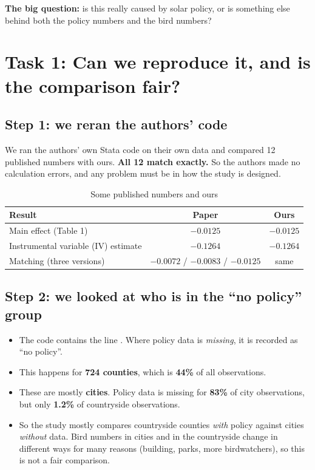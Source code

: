 \documentclass[11pt]{article}
\begin{document}
\textbf{The big question:} is this really caused by solar policy, or is something else behind both the policy numbers and the bird numbers?

\section{Task 1: Can we reproduce it, and is the comparison fair?}

\subsection{Step 1: we reran the authors' code}
We ran the authors' own Stata code on their own data and compared 12 published numbers with ours. \textbf{All 12 match exactly.} So the authors made no calculation errors, and any problem must be in how the study is designed.

\begin{table}[H]\centering\small
\caption{Some published numbers and ours}
\begin{tabular}{lcc}
\toprule
Result & Paper & Ours\\
\midrule
Main effect (Table 1) & $-0.0125$ & $-0.0125$\\
Instrumental variable (IV) estimate & $-0.1264$ & $-0.1264$\\
Matching (three versions) & $-0.0072$ / $-0.0083$ / $-0.0125$ & same\\
\bottomrule
\end{tabular}
\end{table}

\subsection{Step 2: we looked at who is in the ``no policy'' group}
\begin{itemize}
\item The code contains the line . Where policy data is \emph{missing}, it is recorded as ``no policy''.
\item This happens for \textbf{724 counties}, which is \textbf{44\%} of all observations.
\item These are mostly \textbf{cities}. Policy data is missing for \textbf{83\%} of city observations, but only \textbf{1.2\%} of countryside observations.
\item So the study mostly compares countryside counties \emph{with} policy against cities \emph{without} data. Bird numbers in cities and in the countryside change in different ways for many reasons (building, parks, more birdwatchers), so this is not a fair comparison.
\end{itemize}
\end{document}
